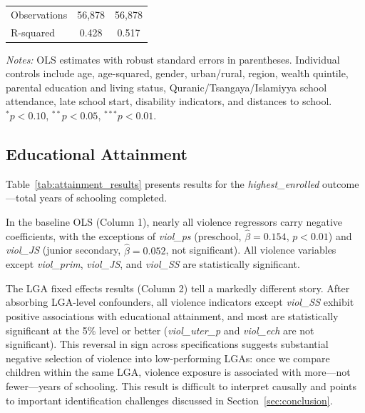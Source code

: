 \begin{table}[H]
\begin{threeparttable}
\begin{tabular}{lcc}
            \midrule
            Observations & 56,878 & 56,878 \\
            R-squared    & 0.428  & 0.517  \\
            \bottomrule
        \end{tabular}
        \begin{tablenotes}
            \small
            \item \textit{Notes:} OLS estimates with robust standard errors
            in parentheses. Individual controls include age, age-squared,
            gender, urban/rural, region, wealth quintile, parental
            education and living status, Quranic/Tsangaya/Islamiyya school
            attendance, late school start, disability indicators, and
            distances to school. $^{*}p < 0.10$, $^{**}p < 0.05$,
            $^{***}p < 0.01$.
        \end{tablenotes}
    \end{threeparttable}
\end{table}

\subsection{Educational Attainment}
\label{sec:results_attainment}

Table~\ref{tab:attainment_results} presents results for the
\textit{highest\_enrolled} outcome---total years of schooling completed.

In the baseline OLS (Column 1), nearly all violence regressors carry
negative coefficients, with the exceptions of \textit{viol\_ps} (preschool,
$\hat{\beta} = 0.154$, $p < 0.01$) and \textit{viol\_JS} (junior secondary,
$\hat{\beta} = 0.052$, not significant). All violence variables except
\textit{viol\_prim}, \textit{viol\_JS}, and \textit{viol\_SS} are
statistically significant.

The LGA fixed effects results (Column 2) tell a markedly different story.
After absorbing LGA-level confounders, all violence indicators except
\textit{viol\_SS} exhibit positive associations with educational attainment,
and most are statistically significant at the 5\% level or better
(\textit{viol\_uter\_p} and \textit{viol\_ech} are not significant). This
reversal in sign across specifications suggests substantial negative
selection of violence into low-performing LGAs: once we compare children
within the same LGA, violence exposure is associated with more---not
fewer---years of schooling. This result is difficult to interpret causally
and points to important identification challenges discussed in
Section~\ref{sec:conclusion}.

